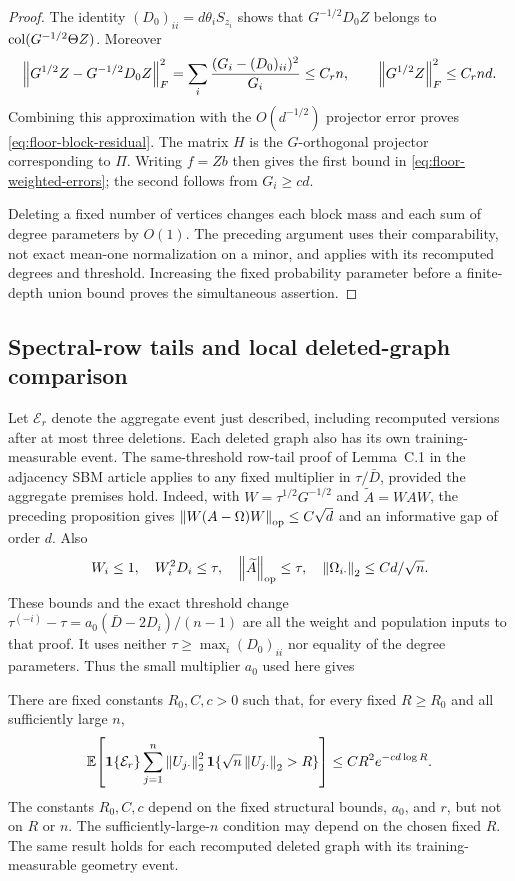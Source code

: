 \begin{proof}
The identity $(D_0)_{ii}=d\theta_iS_{z_i}$ shows that
$G^{-1/2}D_0Z$ belongs to
$\operatorname{col}(G^{-1/2}\Theta Z)$. Moreover
\[
 \left\lVert G^{1/2}Z-G^{-1/2}D_0Z\right\rVert_F^2
 =\sum_i\frac{(G_i-(D_0)_{ii})^2}{G_i}\le C_rn,
 \qquad \left\lVert G^{1/2}Z\right\rVert_F^2\le C_rnd.
\]
Combining this approximation with the $O(d^{-1/2})$ projector
error proves \eqref{eq:floor-block-residual}.
The matrix $H$ is the $G$-orthogonal projector corresponding to
$\Pi$. Writing $f=Zb$ then gives the first bound in
\eqref{eq:floor-weighted-errors}; the second follows from $G_i\ge cd$.

Deleting a fixed number of vertices changes each block mass and
each sum of degree parameters by $O(1)$. The preceding argument
uses their comparability, not exact mean-one normalization on a
minor, and applies with its recomputed degrees and threshold.
Increasing the fixed probability parameter before a finite-depth
union bound proves the simultaneous assertion.
\end{proof}

\subsection{Spectral-row tails and local deleted-graph comparison}
Let $\mathcal E_r$ denote the aggregate event just described, including
recomputed versions after at most three deletions. Each deleted graph
also has its own training-measurable event. The same-threshold row-tail
proof of Lemma~C.1 in the adjacency SBM article applies to any fixed
multiplier in $\tau/\bar D$, provided the aggregate premises hold.
Indeed, with $W=\tau^{1/2}G^{-1/2}$ and $\widetilde A=WAW$, the preceding
proposition gives $\left\lVert W(A-\Omega)W\right\rVert_{\mathrm{op}}\le C\sqrt d$ and
an informative gap of order $d$. Also
\[
 W_i\le1,\quad W_i^2D_i\le\tau,\quad
 \left\lVert\widetilde A\right\rVert_{\mathrm{op}}\le\tau,\quad
 \left\lVert\Omega_{i\cdot}\right\rVert_2\le Cd/\sqrt n.
\]
These bounds and the exact threshold change
$\tau^{(-i)}-\tau=a_0(\bar D-2D_i)/(n-1)$ are all the
weight and population inputs to that proof. It uses neither
$\tau\ge\max_i(D_0)_{ii}$ nor equality of the degree parameters.
Thus the small multiplier $a_0$ used here gives
\begin{lemma}
\label{restore:tail-energy-lemma}
There are fixed constants $R_0,C,c>0$ such that, for every fixed
$R\ge R_0$ and all sufficiently large $n$,
\begin{equation}
 \mathbb E\!\left[\mathbf1\{\mathcal E_r\}
       \sum_{j=1}^n\left\lVert U_{j\cdot}\right\rVert_2^2
                  \mathbf1\{\sqrt n\left\lVert U_{j\cdot}\right\rVert_2>R\}\right]
 \le CR^2e^{-cd\log R}.
 \label{restore:tail-energy}
\end{equation}
The constants $R_0,C,c$ depend on the fixed structural bounds,
$a_0$, and $r$, but not on $R$ or $n$.  The sufficiently-large-$n$
condition may depend on the chosen fixed $R$.  The same result holds
for each recomputed deleted graph with its training-measurable
geometry event.
\end{lemma}


